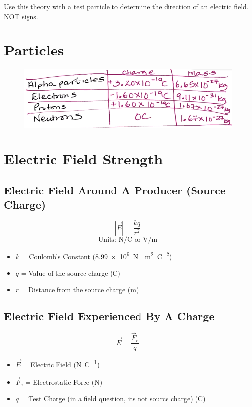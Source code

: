 \documentclass[a4paper,12pt]{article}
\begin{document}
Use this theory with a test particle to determine the direction of an electric field. NOT signs.

\section{Particles}
\begin{figure}[H]
    \centering
    \includegraphics[width=\textwidth]{particles}
\end{figure}

\section{Electric Field Strength}
\subsection{Electric Field Around A Producer (Source Charge)}
\Large $$|\vec{E}| = \frac{kq}{r^2}$$ \normalsize
$$\textrm{Units: } \si{\newton\per\coulomb} \textrm{ or } \si{\V\per\m}$$
\begin{itemize}
    \item{$k$ = Coulomb's Constant (\SI{8.99e9}{\newton\cdot\m\squared\per\coulomb\squared})}
    \item{$q$ = Value of the source charge (\si{\coulomb})}
    \item{$r$ = Distance from the source charge (\si{\m})}
\end{itemize}

\subsection{Electric Field Experienced By A Charge}
\Large $$\vec{E} = \frac{\vec{F}_e}{q}$$ \normalsize
\begin{itemize}
    \item{$\vec{E}$ = Electric Field (\si{\newton\per\coulomb})}
    \item{$\vec{F}_e$ = Electrostatic Force (\si{\newton})}
    \item{$q$ = Test Charge (in a field question, its not source charge) (\si{\coulomb})}
\end{itemize}
\end{document}
